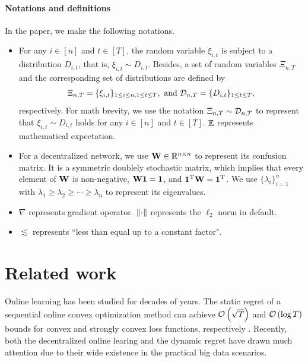 \documentclass{article}
\begin{document}
\paragraph{Notations and definitions}
In the paper, we make the following notations.
\begin{itemize}
\item For any $i\in[n]$ and $t\in[T]$, the random variable $\xi_{i,t}$ is subject to a distribution $D_{i,t}$, that is, $\xi_{i,t} \sim D_{i,t}$. Besides, a set of random variables $\Xi_{n,T}$ and the corresponding set of distributions are defined by
\begin{align}
\nonumber
\Xi_{n,T} = \{ \xi_{i,t} \}_{1\le i \le n, 1 \le t \le T}, \text{~and~} \mathcal{D}_{n,T} = \{ D_{i,t} \}_{1 \le t \le T},
\end{align} respectively. For math brevity, we use the notation $\Xi_{n,T} \sim \mathcal{D}_{n,T}$ to represent that $\xi_{i,t} \sim D_{i,t}$ holds for any $i\in[n]$ and $t\in[T]$. $\mathop{\mathbb{E}}$ represents mathematical expectation.
\item For a decentralized network, we use ${\bf W} \in\mathbb{R}^{n\times n}$ to represent its confusion matrix. It is a symmetric doublely stochastic matrix, which implies that every element of ${\bf W}$ is non-negative, ${\bf W} {\bf 1} = {\bf 1}$, and ${\bf 1}^{\rm T}{\bf W}  = {\bf 1}^{\rm T}$. We use $\{\lambda_i\}_{i=1}^n$ with $\lambda_1 \ge \lambda_2 \ge \cdots \ge \lambda_n$ to represent its eigenvalues. 
\item $\nabla$ represents gradient operator. $\left\lVert\cdot\right\rVert$ represents the $\ell_2$ norm in default.
\item $\lesssim$ represents ``less than equal up to a constant factor".
\end{itemize} 
    











\section{Related work}
\label{sect_related_work}
Online learning has been studied for decades of years. The static regret of a sequential online convex optimization method can achieve ${\mathcal{O}\left( \sqrt{T} \right)}$ and ${\mathcal{O}\left( \log T \right)}$ bounds for convex and strongly convex loss functions, respectively \citep{Hazan2016Introduction,ShalevShwartz:2012dz}. Recently, both the decentralized online learing and the dynamic regret have drawn much attention due to their wide existence in the practical big data scenarios.
\end{document}

